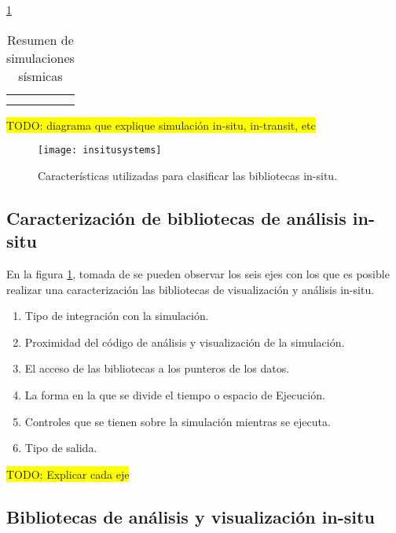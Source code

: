 \ref{tab:seismic_simulations}
\begin{table}
    \centering
    \begin{tabular}{|c|c|}
         &  \\
         & 
    \end{tabular}
    \caption{Resumen de simulaciones sísmicas}
    \label{tab:seismic_simulations}
\end{table}

\colorbox{yellow}{TODO: diagrama que explique simulación in-situ, in-transit, etc}
\begin{figure}
  \texttt{[image: insitusystems]}
  \label{fig:insitusystems}
  \caption{Características utilizadas para clasificar las bibliotecas in-situ.}
\end{figure}
\subsection{Caracterización de bibliotecas de análisis in-situ}
En la figura \ref{fig:insitusystems}, tomada de \cite{childs_terminology_2020} se pueden observar los seis ejes con los que es posible realizar una caracterización las bibliotecas de visualización y análisis in-situ.
\begin{enumerate}
  \item Tipo de integración con la simulación.
  \item Proximidad del código de análisis y visualización de la simulación.
  \item El acceso de las bibliotecas a los punteros de los datos.
  \item La forma en la que se divide el tiempo o espacio de Ejecución.
  \item Controles que se tienen sobre la simulación mientras se ejecuta.
  \item Tipo de salida.
\end{enumerate}
\colorbox{yellow}{TODO: Explicar cada eje}
\subsection{Bibliotecas de análisis y visualización in-situ}
